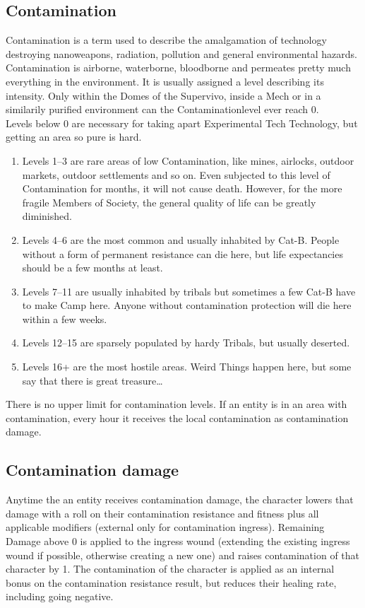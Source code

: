 \subsection{Contamination}\label{subsec:contamination}
Contamination is a term used to describe the amalgamation of technology destroying nanoweapons, radiation, pollution
and general environmental hazards.
Contamination is airborne, waterborne, bloodborne and permeates pretty much everything in the environment.
It is usually assigned a level describing its intensity.
Only within the Domes
of the Supervivo, inside a Mech or in a similarily purified environment can the Contaminationlevel ever reach 0. \\
Levels below 0 are necessary for taking apart Experimental Tech Technology, but getting an area so pure is hard.\\
\begin{enumerate}[label = - ]
\item Levels 1--3
are rare areas of low Contamination, like mines, airlocks, outdoor markets, outdoor settlements and so on.
Even subjected to this level of Contamination for months, it will not cause death.
However, for the more fragile Members of Society, the general quality of life can be greatly diminished.
\item Levels 4--6
are the most common and usually inhabited by Cat-B\@.
People without a form of permanent resistance can die here, but life expectancies should be a few months at least.
\item Levels 7--11
are usually inhabited by tribals but sometimes a few Cat-B have to make Camp here.
Anyone without contamination protection will die here within a few weeks.
\item Levels 12--15
are sparsely populated by hardy Tribals, but usually deserted.
\item Levels 16+
are the most hostile areas.
Weird Things happen here, but some say that there is great treasure\ldots
\end{enumerate}
There is no upper limit for contamination levels.
If an entity is in an area with contamination, every hour it receives the local contamination
as contamination damage.\par
\subsection{Contamination damage}\label{subsec:contamination-damage}
Anytime the an entity receives contamination damage, the character lowers that damage with a roll on their contamination
resistance and fitness plus all applicable modifiers (external only for contamination ingress).
Remaining Damage above 0 is applied to the ingress wound (extending the existing ingress wound if possible,
otherwise creating a new one) and raises contamination of that character by 1.
The contamination of the character is applied as an internal bonus on the contamination resistance result, but reduces
their healing rate, including going negative.

